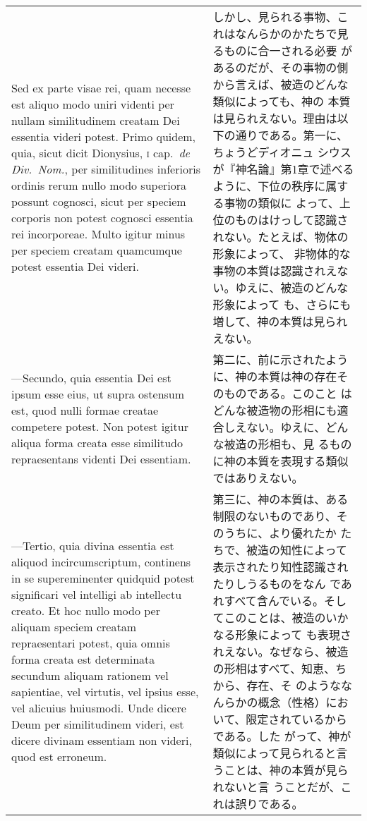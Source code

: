 \documentclass[10pt]{jsarticle} %
\begin{document}
\begin{longtable}{p{21em}p{21em}}
\\

Sed ex parte visae rei, quam necesse est aliquo modo uniri videnti per
nullam similitudinem creatam Dei essentia videri potest. Primo quidem,
quia, sicut dicit Dionysius, {\scshape i} cap.\ {\itshape de Div.\
Nom.}, per similitudines inferioris ordinis rerum nullo modo superiora
possunt cognosci, sicut per speciem corporis non potest cognosci
essentia rei incorporeae. Multo igitur minus per speciem creatam
quamcumque potest essentia Dei videri.

&

しかし、見られる事物、これはなんらかのかたちで見るものに合一される必要
があるのだが、その事物の側から言えば、被造のどんな類似によっても、神の
本質は見られえない。理由は以下の通りである。第一に、ちょうどディオニュ
シウスが『神名論』第1章で述べるように、下位の秩序に属する事物の類似に
よって、上位のものはけっして認識されない。たとえば、物体の形象によって、
非物体的な事物の本質は認識されえない。ゆえに、被造のどんな形象によって
も、さらにも増して、神の本質は見られえない。

\\

---Secundo, quia essentia Dei est ipsum esse eius, ut supra ostensum
est, quod nulli formae creatae competere potest. Non potest igitur
aliqua forma creata esse similitudo repraesentans videnti Dei
essentiam.

&

第二に、前に示されたように、神の本質は神の存在そのものである。このこと
はどんな被造物の形相にも適合しえない。ゆえに、どんな被造の形相も、見
るものに神の本質を表現する類似ではありえない。

\\

---Tertio, quia divina essentia est aliquod incircumscriptum,
continens in se supereminenter quidquid potest significari vel
intelligi ab intellectu creato. Et hoc nullo modo per aliquam speciem
creatam repraesentari potest, quia omnis forma creata est determinata
secundum aliquam rationem vel sapientiae, vel virtutis, vel ipsius
esse, vel alicuius huiusmodi. Unde dicere Deum per similitudinem
videri, est dicere divinam essentiam non videri, quod est erroneum.

&

第三に、神の本質は、ある制限のないものであり、そのうちに、より優れたか
たちで、被造の知性によって表示されたり知性認識されたりしうるものをなん
であれすべて含んでいる。そしてこのことは、被造のいかなる形象によって
も表現されえない。なぜなら、被造の形相はすべて、知恵、ちから、存在、そ
のようななんらかの概念（性格）において、限定されているからである。した
がって、神が類似によって見られると言うことは、神の本質が見られないと言
うことだが、これは誤りである。



\end{longtable}
\end{document}

